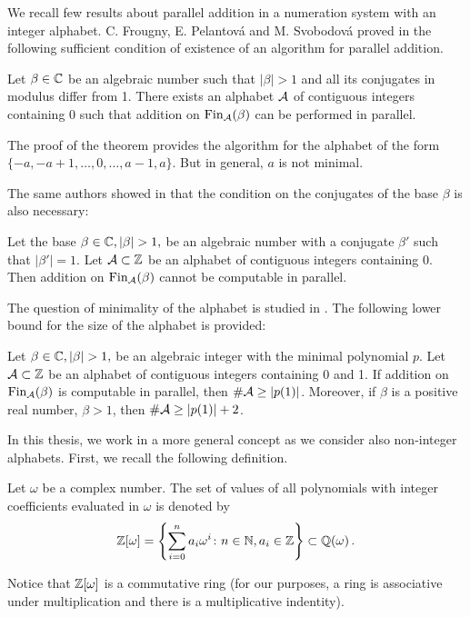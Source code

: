 We recall few results about parallel addition in a numeration system with an integer alphabet. C. Frougny, E. Pelantov\'a and M. Svobodov\'a proved in \cite{parAddNS} the following sufficient condition of existence of an algorithm for parallel addition.
  \begin{theo}
  \label{thm:suffConjugates}
  Let $\beta\in\mathbb{C}$ be an algebraic number such that $|\beta|>1$ and all its conjugates in modulus differ from 1. There exists an alphabet $\mathcal{A}$ of contiguous integers containing 0 such that addition on $\text{Fin}_{\mathcal{A}}(\beta)$ can be performed in parallel.
  \end{theo}
  The proof of the theorem provides the algorithm for the alphabet of the form $\{-a,-a+1, \dots,0,\dots,a-1,a\}$. But in general, $a$ is not minimal.
    
The same authors showed in \cite{kBlock} that the condition on the conjugates of the base $\beta$ is also necessary:
  \begin{theo}
  Let the base $\beta\in\CC, |\beta|>1,$ be an algebraic number with a conjugate $\beta'$ such that $|\beta'|=1$. Let $\mathcal{A}\subset\mathbb{Z}$ be an alphabet of contiguous integers containing 0. Then addition on $\text{Fin}_{\mathcal{A}}(\beta)$ cannot be computable in parallel.
  \end{theo}
  
The question of minimality of the alphabet is studied in \cite{minAlph}. The following lower bound for the size of the alphabet is provided:
  \begin{theo}
  \label{thm:lowerBoundAlphabet}
  Let $\beta\in\CC, |\beta|>1,$  be an algebraic integer with the minimal polynomial $p$. Let $\mathcal{A}\subset\mathbb{Z}$ be an alphabet of contiguous integers containing 0 and 1. If addition on $\text{Fin}_{\mathcal{A}}(\beta)$ is computable in parallel, then $\#\mathcal{A} \geq |p(1)|$. Moreover, if $\beta$ is a positive real number, $\beta>1$, then $\#\mathcal{A} \geq  |p(1)|+2$.
  \end{theo}
  

In this thesis, we work in a more general concept as we consider also non-integer alphabets. First, we recall the following definition.
\begin{defn}
Let $\omega$ be a complex number. The set of values of all polynomials with integer coefficients evaluated in $\omega$ is denoted by
$$
    \mathbb{Z}[\omega] =\left\{\sum_{i=0}^n a_i \omega^i\colon n\in\mathbb{N}, a_i\in\mathbb{Z} \right\} \subset \mathbb{Q}(\omega)\,.
$$
\end{defn}
 Notice that $\mathbb{Z}[\omega]$ is a commutative ring (for our purposes, a ring is associative under multiplication and there is a multiplicative indentity).     
    
